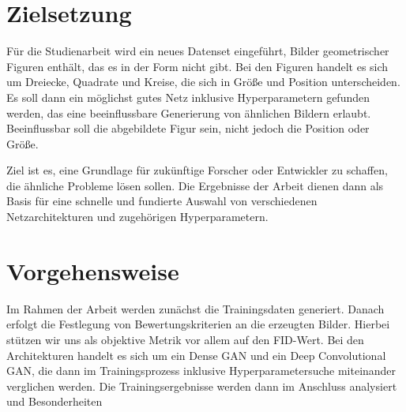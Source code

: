 \section{Zielsetzung}
Für die Studienarbeit wird ein neues Datenset eingeführt, Bilder geometrischer Figuren enthält, das es in der Form nicht gibt.
Bei den Figuren handelt es sich um Dreiecke, Quadrate und Kreise, die sich in Größe und Position unterscheiden.
Es soll dann ein möglichst gutes Netz inklusive Hyperparametern gefunden werden, das eine beeinflussbare Generierung von ähnlichen Bildern erlaubt.
Beeinflussbar soll die abgebildete Figur sein, nicht jedoch die Position oder Größe.

Ziel ist es, eine Grundlage für zukünftige Forscher oder Entwickler zu schaffen, die ähnliche Probleme lösen sollen.
Die Ergebnisse der Arbeit dienen dann als Basis für eine schnelle und fundierte Auswahl von verschiedenen Netzarchitekturen und zugehörigen Hyperparametern.

\section{Vorgehensweise}
Im Rahmen der Arbeit werden zunächst die Trainingsdaten generiert.
Danach erfolgt die Festlegung von Bewertungskriterien an die erzeugten Bilder.
Hierbei stützen wir uns als objektive Metrik vor allem auf den FID-Wert.
Bei den Architekturen handelt es sich um ein Dense GAN und ein Deep Convolutional GAN, die dann im Trainingsprozess inklusive Hyperparametersuche miteinander verglichen werden.
Die Trainingsergebnisse werden dann im Anschluss analysiert und Besonderheiten 
